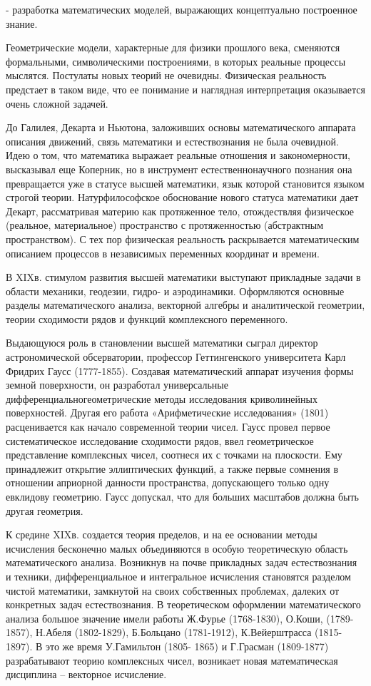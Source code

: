 \documentclass[exam_answers.tex]{subfiles}
\begin{document}
- разработка математических моделей, выражающих концептуально
построенное знание.

Геометрические модели, характерные для физики прошлого века,
сменяются формальными, символическими построениями, в которых реальные
процессы мыслятся. Постулаты новых теорий не очевидны. Физическая
реальность предстает в таком виде, что ее понимание и наглядная
интерпретация оказывается очень сложной задачей. 

До Галилея, Декарта и Ньютона, заложивших основы математического
аппарата описания движений, связь математики и естествознания не была
очевидной. Идею о том, что математика выражает реальные отношения и
закономерности, высказывал еще Коперник, но в инструмент
естественнонаучного познания она превращается уже в статусе высшей
математики, язык которой становится языком строгой теории.
Натурфилософское обоснование нового статуса математики дает Декарт,
рассматривая материю как протяженное тело, отождествляя физическое
(реальное, материальное) пространство с протяженностью (абстрактным
пространством). С тех пор физическая реальность раскрывается
математическим описанием процессов в независимых переменных координат и
времени.

В XIXв. стимулом развития высшей математики выступают прикладные
задачи в области механики, геодезии, гидро- и аэродинамики. Оформляются
основные разделы математического анализа, векторной алгебры и
аналитической геометрии, теории сходимости рядов и функций комплексного
переменного.

Выдающуюся роль в становлении высшей математики сыграл директор
астрономической обсерватории, профессор Геттингенского университета Карл
Фридрих Гаусс (1777-1855). Создавая математический аппарат изучения формы
земной поверхности,
он разработал универсальные дифференциальногеометрические методы исследования криволинейных поверхностей.
Другая его работа «Арифметические исследования» (1801) расценивается как начало
современной теории чисел. Гаусс провел первое систематическое исследование
сходимости рядов, ввел геометрическое представление комплексных чисел,
соотнеся их с точками на плоскости. Ему принадлежит открытие
эллиптических функций, а также первые сомнения в отношении априорной
данности пространства, допускающего только одну евклидову геометрию.
Гаусс допускал, что для больших масштабов должна быть другая геометрия.

К средине XIXв. создается теория пределов, и на ее основании методы
исчисления бесконечно малых объединяются в особую теоретическую область
математического анализа. Возникнув на почве прикладных задач
естествознания и техники, дифференциальное и интегральное исчисления
становятся разделом чистой математики, замкнутой на своих собственных
проблемах, далеких от конкретных задач естествознания. В теоретическом
оформлении математического анализа большое значение имели работы
Ж.Фурье (1768-1830), О.Коши, (1789-1857), Н.Абеля (1802-1829), Б.Больцано
(1781-1912), К.Вейерштрасса (1815-1897). В это же время У.Гамильтон (1805-
1865) и Г.Грасман (1809-1877) разрабатывают теорию комплексных чисел,
возникает новая математическая дисциплина – векторное исчисление.
\end{document}
